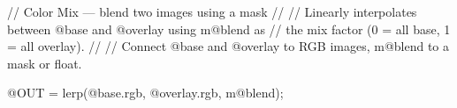 // Color Mix — blend two images using a mask
//
// Linearly interpolates between @base and @overlay using m@blend as
// the mix factor (0 = all base, 1 = all overlay).
//
// Connect @base and @overlay to RGB images, m@blend to a mask or float.

@OUT = lerp(@base.rgb, @overlay.rgb, m@blend);